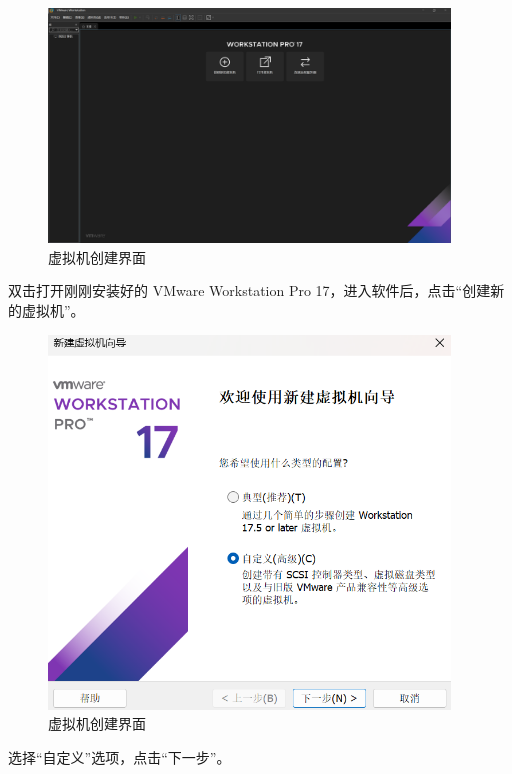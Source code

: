 \documentclass[UTF8]{ctexart}
\begin{document}
\begin{figure}[H]
    \centering
    \includegraphics[width=0.95\textwidth]{picture/Screenshot 2024-10-14 112401.png}
    \caption{虚拟机创建界面}
\end{figure}
双击打开刚刚安装好的 VMware Workstation Pro 17，进入软件后，点击“创建新的虚拟机”。

\begin{figure}[H]
    \centering
    \includegraphics[width=0.95\textwidth]{picture/Screenshot 2024-10-14 112615.png}
    \caption{虚拟机创建界面}
\end{figure}
选择“自定义”选项，点击“下一步”。
\end{document}
